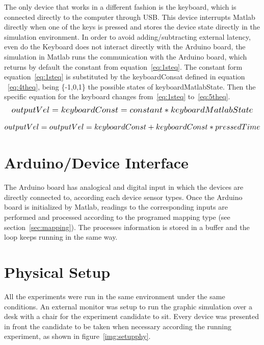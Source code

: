 The only device that works in a different fashion is the keyboard, which is connected directly to the computer through USB. This device interrupts Matlab directly when one of the keys is pressed and stores the device state directly in the simulation environment. In order to avoid adding/subtracting external latency, even do the Keyboard does not interact directly with the Arduino board, the simulation in Matlab runs the communication with the Arduino board, which returns by default the constant from equation~\ref{eq:1steq}. The constant form equation~\ref{eq:1steq} is substituted by the keyboardConsat defined in equation ~\ref{eq:4theq}, being \{-1,0,1\} the possible states of keyboardMatlabState. Then the specific equation for the keyboard changes from~\ref{eq:1steq} to~\ref{eq:5theq}.\\

\begin{equation}
   \scalebox{1.2}{$outputVel=keyboardConst=constant*keyboardMatlabState$}
   \centering
   \label{eq:4theq}
\end{equation}

\begin{equation}
   \scalebox{1.2}{$outputVel=outputVel=keyboardConst+keyboardConst*pressedTime$}
   \centering
   \label{eq:5theq}
\end{equation}


\section{Arduino/Device Interface}\label{sec:arddevinter}
The Arduino board has analogical and digital input in which the devices are directly connected to, according each device sensor types. Once the Arduino board is initialized by Matlab, readings to the corresponding inputs are performed and processed according to the programed mapping type (see section~\ref{sec:mapping}). The processes information is stored in a buffer and the loop keeps running in the same way.\\

\section{Physical Setup}\label{sec:physical}
All the experiments were run in the same environment under the same conditions. An external monitor was setup to run the graphic simulation over a desk with a chair for the experiment candidate to sit. Every device was presented in front the candidate to be taken when necessary according the running experiment, as shown in figure~\ref{img:setupphy}.\\

